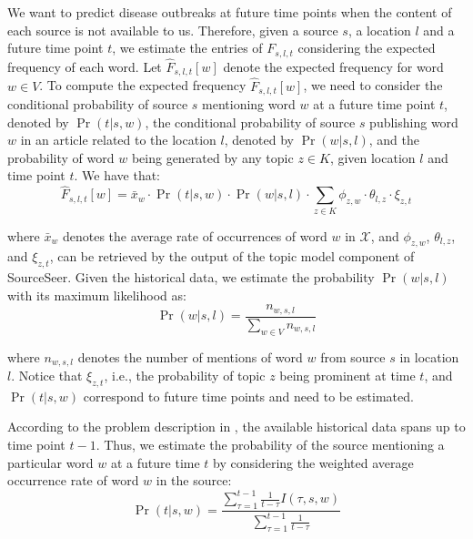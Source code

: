 \documentclass[twoside,leqno,twocolumn]{article}
\newcommand{\fullmodel}{{{\sf SourceSeer}}\xspace}
\begin{document}
We want to predict disease outbreaks at future time points when the content of each source is not available to us. Therefore, given a source $s$, a location $l$ and a future time point $t$, we estimate the entries of $F_{s,l,t}$ considering the expected frequency of each word. Let $\hat{F}_{s,l,t}[w]$ denote the expected frequency for word 
$w \in V$. To compute the expected frequency $\hat{F}_{s,l,t}[w]$, we need to consider the conditional probability of source $s$ mentioning word $w$ at a future time point $t$, denoted by $\Pr(t|s,w)$, the conditional probability of source $s$ publishing word $w$ in an article related to the location $l$, denoted by $\Pr(w|s,l)$, and 
the probability of word $w$ being generated by any topic $z \in K$, given location $l$ and time point $t$. 
We have that:
\begin{equation*}
  \hat{F}_{s,l,t}[w] = \bar{x}_{w} \cdot \Pr(t|s,w) \cdot \Pr(w|s,l)\cdot \sum_{z \in K}\phi_{z,w}\cdot \theta_{l,z} \cdot \xi_{z,t}
\end{equation*}

\noindent where $\bar{x}_{w}$ denotes the average rate of occurrences of word $w$ in $\mathcal{X}$,  and 
$\phi_{z,w}$, $\theta_{l,z}$, and $\xi_{z,t}$, can be retrieved by the output of the topic model component of \fullmodel.  Given the historical data, we estimate the probability $\Pr(w|s,l)$ with its maximum likelihood as:
\begin{equation}
  \Pr(w|s,l) = \frac{n_{w,s,l}}{\sum_{w\in V}n_{w,s,l}}
\end{equation}

\noindent where $n_{w,s,l}$ denotes the number of mentions of word $w$ from source $s$ in location $l$.
Notice that $\xi_{z,t}$, i.e., the probability of topic $z$ being prominent at time $t$, 
and $\Pr(t|s,w)$ correspond to future time points and need to be estimated.  

According to the problem description in , the available historical 
data spans up to time point $t-1$. Thus, we estimate the probability of the source 
mentioning a particular word $w$ at a future time $t$ by considering the weighted average occurrence rate of word $w$ in the source:
\begin{equation}
\Pr(t|s,w) = \frac{\sum_{\tau = 1}^{t-1} \frac{1}{t - \tau}I(\tau,s,w)}{\sum_{\tau = 1}^{t-1} \frac{1}{t - \tau}}
\label{eq:prob_time}
\end{equation}
\end{document}
